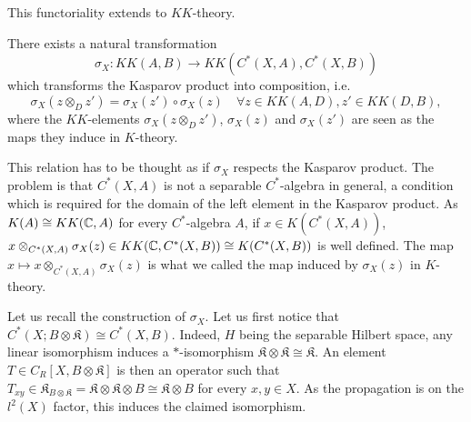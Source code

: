This functoriality extends to $KK$-theory.

\begin{thm}\label{sigma} There exists a natural transformation 
\[\sigma_X : KK(A,B)\rightarrow KK(C^*(X,A),C^*(X,B))\]
which transforms the Kasparov product into composition, i.e. 
\[\sigma_X(z\otimes_D z')= \sigma_X(z')\circ \sigma_X(z) \quad \forall z\in KK(A,D),z'\in KK(D,B),\]
where the $KK$-elements $\sigma_X(z\otimes_D z')$, $ \sigma_X(z)$ and $\sigma_X(z')$ are seen as the maps they induce in $K$-theory. 
\end{thm}

\begin{rk}
This relation has to be thought as if $\sigma_X$ respects the Kasparov product. The problem is that $C^*(X,A)$ is not a separable $C^*$-algebra in general, a condition which is required for the domain of the left element in the Kasparov product. As $K(A) \cong KK(\mathbb C,A)$ for every $C^*$-algebra $A$, if $x\in K(C^*(X,A))$, $x\otimes_{C^*(X,A)}\sigma_X(z)\in KK(\mathbb C,C^*(X,B))\cong K(C^*(X,B))$ is well defined. The map $x\mapsto x\otimes_{C^*(X,A)}\sigma_X(z)$ is what we called the map induced by $\sigma_X(z)$ in $K$-theory.
\end{rk}

Let us recall the construction of $\sigma_X$. Let us first notice that $C^*(X;B\otimes\mathfrak K)\cong C^*(X,B)$. Indeed, $H$ being the separable Hilbert space, any linear isomorphism induces a $*$-isomorphism $\mathfrak K \otimes \mathfrak K \cong \mathfrak K$. An element $T\in C_R[X,B\otimes\mathfrak K]$ is then an operator such that $T_{xy}\in \mathfrak K_{B\otimes\mathfrak K}= \mathfrak K\otimes \mathfrak K \otimes B \cong \mathfrak K\otimes B$ for every $x,y\in X$. As the propagation is on the $l^2(X)$ factor, this induces the claimed isomorphism. \\

